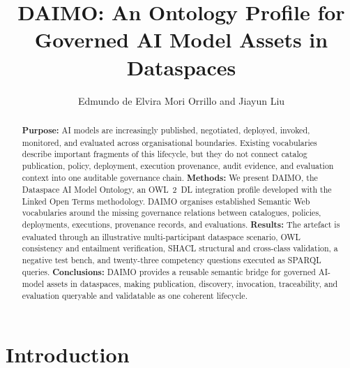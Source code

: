 \documentclass[Afour,sagev,times]{sagej}
\begin{document}

\title{DAIMO: An Ontology Profile for Governed AI Model Assets in Dataspaces}

\author{Edmundo de Elvira Mori Orrillo and Jiayun Liu}




\begin{abstract}
\textbf{Purpose:} AI models are increasingly published, negotiated, deployed, invoked, monitored, and evaluated across organisational boundaries. Existing vocabularies describe important fragments of this lifecycle, but they do not connect catalog publication, policy, deployment, execution provenance, audit evidence, and evaluation context into one auditable governance chain.
\textbf{Methods:} We present DAIMO, the Dataspace AI Model Ontology, an OWL~2~DL integration profile developed with the Linked Open Terms methodology. DAIMO organises established Semantic Web vocabularies around the missing governance relations between catalogues, policies, deployments, executions, provenance records, and evaluations.
\textbf{Results:} The artefact is evaluated through an illustrative multi-participant dataspace scenario, OWL consistency and entailment verification, SHACL structural and cross-class validation, a negative test bench, and twenty-three competency questions executed as SPARQL queries.
\textbf{Conclusions:} DAIMO provides a reusable semantic bridge for governed AI-model assets in dataspaces, making publication, discovery, invocation, traceability, and evaluation queryable and validatable as one coherent lifecycle.
\end{abstract}


\maketitle

\section{Introduction}\label{sec:intro}
\end{document}
